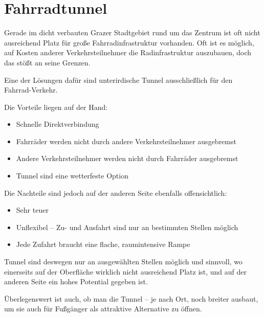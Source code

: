 \chapter{Fahrradtunnel}
Gerade im dicht verbauten Grazer Stadtgebiet rund um das Zentrum ist oft nicht ausreichend Platz für große Fahrradinfrastruktur vorhanden. Oft ist es möglich, auf Kosten anderer Verkehrsteilnehmer die Radinfrastruktur auszubauen, doch das stößt an seine Grenzen.

Eine der Lösungen dafür sind unterirdische Tunnel ausschließlich für den Fahrrad-Verkehr.

Die Vorteile liegen auf der Hand:
\begin{itemize}
    \item Schnelle Direktverbindung
    \item Fahrräder werden nicht durch andere Verkehrsteilnehmer ausgebremst
    \item Andere Verkehrsteilnehmer werden nicht durch Fahrräder ausgebremst
    \item Tunnel sind eine wetterfeste Option
\end{itemize}

Die Nachteile sind jedoch auf der anderen Seite ebenfalls offensichtlich:
\begin{itemize}
    \item Sehr teuer
    \item Unflexibel -- Zu- und Ausfahrt sind nur an bestimmten Stellen möglich
    \item Jede Zufahrt braucht eine flache, raumintensive Rampe
\end{itemize}

Tunnel sind deswegen nur an ausgewählten Stellen möglich und sinnvoll, wo einerseits auf der Oberfläche wirklich nicht ausreichend Platz ist, und auf der anderen Seite ein hohes Potential gegeben ist.

Überlegenswert ist auch, ob man die Tunnel -- je nach Ort, noch breiter ausbaut, um sie auch für Fußgänger als attraktive Alternative zu öffnen.



